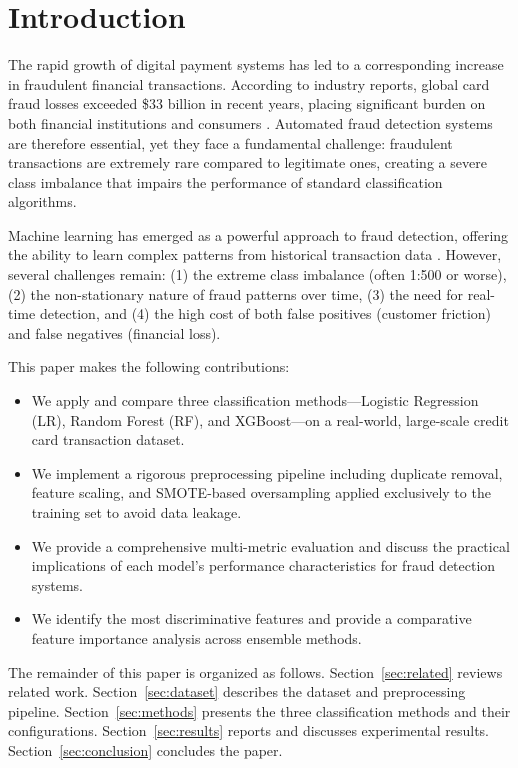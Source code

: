 \documentclass[conference]{IEEEtran}
\begin{document}
\section{Introduction}

The rapid growth of digital payment systems has led to a corresponding increase in fraudulent financial transactions. According to industry reports, global card fraud losses exceeded \$33 billion in recent years, placing significant burden on both financial institutions and consumers \cite{nilson2023}. Automated fraud detection systems are therefore essential, yet they face a fundamental challenge: fraudulent transactions are extremely rare compared to legitimate ones, creating a severe class imbalance that impairs the performance of standard classification algorithms.

Machine learning has emerged as a powerful approach to fraud detection, offering the ability to learn complex patterns from historical transaction data \cite{dal2015}. However, several challenges remain: (1) the extreme class imbalance (often 1:500 or worse), (2) the non-stationary nature of fraud patterns over time, (3) the need for real-time detection, and (4) the high cost of both false positives (customer friction) and false negatives (financial loss).

This paper makes the following contributions:
\begin{itemize}
    \item We apply and compare three classification methods—Logistic Regression (LR), Random Forest (RF), and XGBoost—on a real-world, large-scale credit card transaction dataset.
    \item We implement a rigorous preprocessing pipeline including duplicate removal, feature scaling, and SMOTE-based oversampling applied exclusively to the training set to avoid data leakage.
    \item We provide a comprehensive multi-metric evaluation and discuss the practical implications of each model's performance characteristics for fraud detection systems.
    \item We identify the most discriminative features and provide a comparative feature importance analysis across ensemble methods.
\end{itemize}

The remainder of this paper is organized as follows. Section~\ref{sec:related} reviews related work. Section~\ref{sec:dataset} describes the dataset and preprocessing pipeline. Section~\ref{sec:methods} presents the three classification methods and their configurations. Section~\ref{sec:results} reports and discusses experimental results. Section~\ref{sec:conclusion} concludes the paper.
\end{document}
